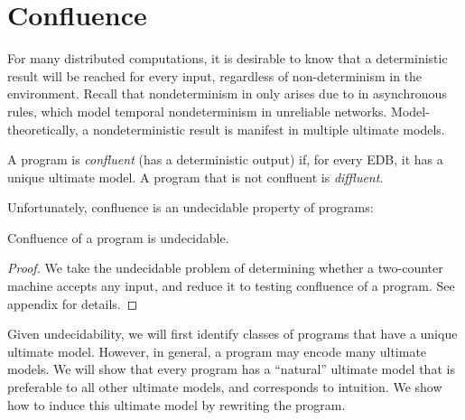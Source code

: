 \section{Confluence}
\label{sec:confluence}

For many distributed computations, it is desirable to know that a deterministic result will be reached for every input, regardless of non-determinism in the environment.  Recall that nondeterminism in \lang only arises due to  in asynchronous rules, 
which model temporal nondeterminism in unreliable networks.
Model-theoretically, a nondeterministic result is manifest in multiple ultimate models.

\begin{definition}
A \lang program is {\em confluent} (has a deterministic output) if, for every EDB, it has a unique ultimate model.  A program that is not confluent is {\em diffluent}.
\end{definition}

Unfortunately, confluence is an undecidable property of \lang programs:

\begin{lemma}
\label{lem:confluence-undecidable}
Confluence of a \lang program is undecidable.
\end{lemma}
\begin{proof}
We take the undecidable problem of determining whether a two-counter machine accepts any input, and reduce it to testing confluence of a \lang program.  See appendix for details.
\end{proof}

Given undecidability, we will first identify classes of programs that have a unique ultimate model.  However, in general, a \lang program may encode many ultimate models.  We will show that every \lang program has a ``natural'' ultimate model that is preferable to all other ultimate models, and corresponds to intuition.  We show how to induce this ultimate model by rewriting the program.


